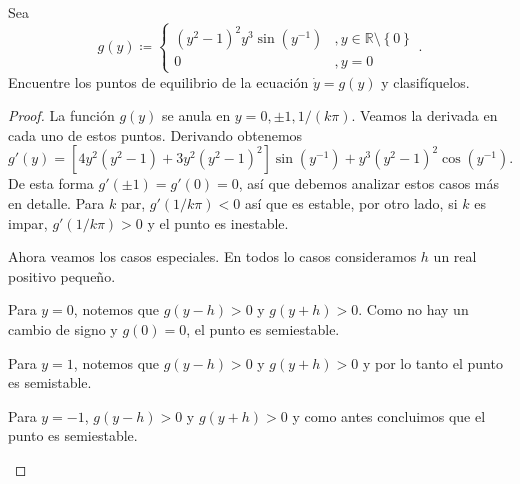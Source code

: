 \documentclass[../pheader.tex]{subfiles}
\begin{document}
\begin{problema}
Sea
\[
    g(y) \coloneqq
    \begin{cases}
        \left(y^2 - 1\right)^2 y^3 \sin\left(y^{-1}\right)
            &, y\in \mathbb{R}\setminus \left\{ 0 \right\} \\
        0 &, y = 0
    \end{cases}
.\]
Encuentre los puntos de equilibrio de la ecuación \(\dot{y} = g(y)\) y
clasifíquelos.
\end{problema}
\begin{proof}
La función \(g(y)\) se anula en \(y = 0, \pm 1, 1/(k\pi)\). Veamos la derivada
en cada uno de estos puntos. Derivando obtenemos
\[
    g'(y) = \left[4y^2(y^2-1) + 3y^2 (y^2-1)^2\right]\sin\left(y^{-1}\right)
    + y^3 (y^2-1)^2 \cos\left(y^{-1}\right)
.\]
De esta forma \(g'(\pm 1) = g'(0) = 0\), así que debemos analizar estos casos
más en detalle. Para \(k\) par, \(g'(1/k\pi) < 0\) así que es estable, por otro
lado, si \(k\) es impar, \(g'(1/k\pi) > 0\) y el punto es inestable.

Ahora veamos los casos especiales. En todos lo casos consideramos \(h\) un real
positivo pequeño.
\begin{clist}
\item Para \(y=0\), notemos que \(g(y-h) > 0\) y \(g(y+h) > 0\). Como no hay un cambio
de signo y \(g(0) = 0\), el punto es semiestable.

\item Para \(y=1\), notemos que \(g(y-h) > 0\) y \(g(y+h) > 0\) y por lo tanto el
punto es semistable.

\item Para \(y=-1\), \(g(y-h) > 0\) y \(g(y+h) > 0\) y como antes concluimos que
el punto es semiestable.
\end{clist}
\end{proof}
\end{document}
